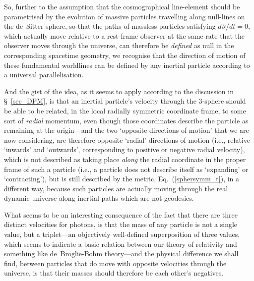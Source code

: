 So, further to the assumption that the cosmographical line-element should be parametrised by the evolution of massive particles travelling along null-lines on the de~Sitter sphere, so that the paths of massless particles satisfying $d\vartheta/dt=0$, which actually move relative to a rest-frame observer at the same rate that the observer moves through the universe, can therefore be \textit{defined} as null in the corresponding spacetime geometry, we recognise that the direction of motion of these fundamental worldlines can be defined by any inertial particle according to a universal parallelisation.

And the gist of the idea, as it seems to apply according to the discussion in \S~\ref{sec_DPM}, is that an inertial particle's velocity through the 3-sphere should be able to be related, in the local radially symmetric coordinate frame, to some sort of \textit{radial} momentum, even though those coordinates describe the particle as remaining at the origin---and the two `opposite directions of motion' that we are now considering, are therefore opposite `radial' directions of motion (i.e., relative `inwards' and `outwards', corresponding to positive or negative radial velocity), which is not described as taking place \textit{along} the radial coordinate in the proper frame of such a particle (i.e., a particle does not describe itself as `expanding' or `contracting'), but is still described by the metric, Eq.~(\ref{sphersymm_t}), in a different way, because such particles are actually moving through the real dynamic universe along inertial paths which are not geodesics. 

What seems to be an interesting consequence of the fact that there are three distinct velocities for photons, is that the mass of any particle is not a single value, but a triplet---an objectively well-defined superposition of three values, which seems to indicate a basic relation between our theory of relativity and something like de~Broglie-Bohm theory---and the physical difference we shall find, between particles that do move with opposite velocities through the universe, is that their masses should therefore be each other's negatives. 

